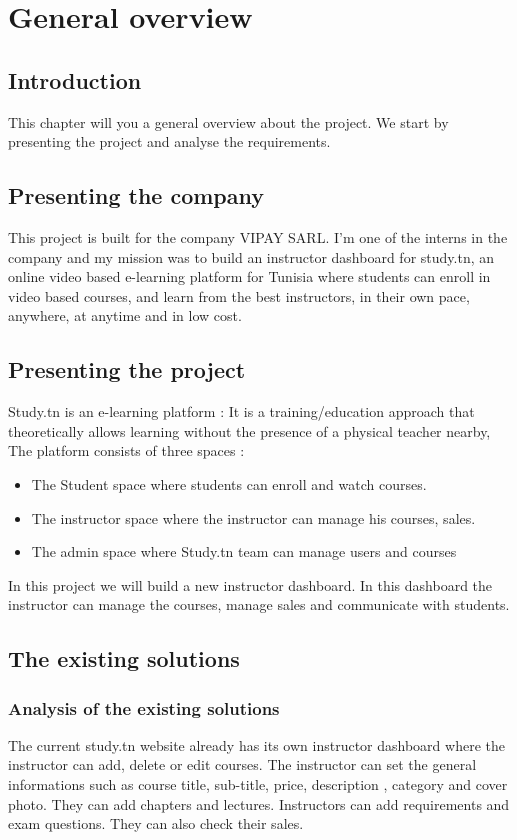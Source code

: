 \chapter{General overview}
\newpage
\section*{Introduction}
This chapter will you a general overview about the project. We start by presenting the project and analyse the requirements.
\section{Presenting the company}
This project is built for the company VIPAY SARL. I'm one of the interns in the company and
my mission was to build an instructor dashboard for study.tn, an online video based e-learning platform for Tunisia where students can enroll in video based courses, and learn from the best instructors, in their own pace, anywhere, at anytime and in low cost.
\section{Presenting the project}
Study.tn is an e-learning platform : It is a training/education approach that theoretically allows learning without the presence of a physical teacher nearby, 
\hfill \break
\hfill \break
The platform consists of three spaces :

\begin{itemize}
  \item The Student space where students can enroll and watch courses.
  \item The instructor space where the instructor can manage his courses, sales.
  \item The admin space where Study.tn team can manage users and courses 
\end{itemize}

In this project we will build a new instructor dashboard. In this dashboard the instructor can manage the courses, manage sales and communicate with students.
\section{The existing solutions}
\subsection{Analysis of the existing solutions}
The current study.tn website already has its own instructor dashboard where the instructor can add, delete or edit courses. The instructor can set the general informations such as course title,
sub-title, price, description , category and cover photo. They can add chapters and lectures. Instructors can add requirements and exam questions. They can also check their sales.

